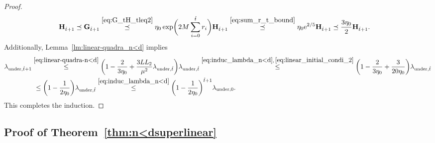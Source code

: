 \documentclass[11pt]{article}
\theoremstyle{plain}
\theoremstyle{definition}
\theoremstyle{remark}
\theoremstyle{plain}
\def\G{{\bf G}}
\def\H{{\bf H}}
\begin{document}
\begin{proof}
\begin{align*}
\H_{{\hat t}+1}
&\preceq\G_{{\hat t}+1}
\overset{\eqref{eq:G_tH_tleq2}}{\preceq}
\eta_0\exp\biggl(2M\sum_{i=0}^{\hat t}r_i\biggr)\H_{\hat t+1}
\overset{\eqref{eq:sum_r_t_bound}}{\preceq}
\eta_0{\rm e}^{2/5}\H_{\hat t+1}
\preceq\frac{3\eta_0}{2}\H_{\hat t+1}.
\end{align*}
Additionally, Lemma~\ref{lm:linear-quadra_n<d} implies
\begin{align*}
\lambda_{\mathrm{under},\hat t+1}
&\overset{\eqref{eq:linear-quadra-n<d}}{\leq}
\biggl(1-\frac{2}{3\eta_0}
+\frac{3LL_2}{\mu^2}\lambda_{\mathrm{under},\hat t}\biggr)
\lambda_{\mathrm{under},\hat t}\overset{\eqref{eq:induc_lambda_n<d},\,\eqref{eq:linear_initial_condi_2}}{\leq}
\biggl(1-\frac{2}{3\eta_0}+\frac{3}{20\eta_0}\biggr)
\lambda_{\mathrm{under},\hat t}\\
&~\leq\biggl(1-\frac{1}{2\eta_0}\biggr)
\lambda_{\mathrm{under},\hat t}
\overset{\eqref{eq:induc_lambda_n<d}}{\leq}
\biggl(1-\frac{1}{2\eta_0}\biggr)^{\hat t+1}
\lambda_{\mathrm{under},0}.
\end{align*}
This completes the induction.
\end{proof}



\subsection{Proof of Theorem~\ref{thm:n<dsuperlinear}}
\label{app:proof_theorem_superlinaer_under}
\end{document}
